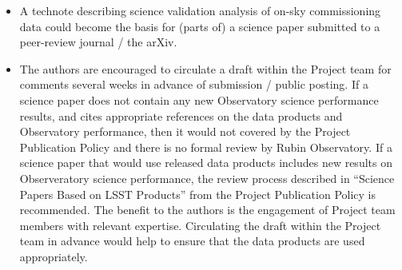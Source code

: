 \documentclass[SE,authoryear,toc,lsstdraft]{lsstdoc}
\begin{document}
\begin{itemize}

  \item A technote describing science validation analysis of on-sky commissioning data could become the basis for (parts of) a science paper submitted to a peer-review journal / the arXiv.


  \item The authors are encouraged to circulate a draft within the Project team for comments several weeks in advance of submission / public posting.
  If a science paper does not contain any new Observatory science performance results, and cites appropriate references on the data products and Observatory performance, then it would not covered by the Project Publication Policy and there is no formal review by Rubin Observatory.
  If a science paper that would use released data products includes new results on Observeratory science performance, the review process described in ``Science Papers Based on LSST Products'' from the Project Publication Policy  is recommended.
  The benefit to the authors is the engagement of Project team members with relevant expertise.
  Circulating the draft within the Project team in advance would help to ensure that the data products are used appropriately.


\end{itemize}
\end{document}
